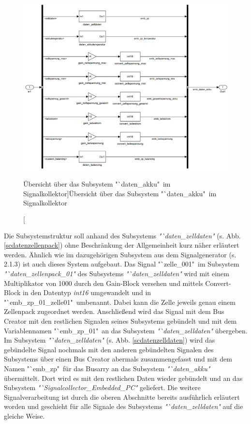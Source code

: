 \documentclass[fontsize = 12pt, paper = a4]{scrreprt}
\begin{document}
\newpage

\begin{figure}[h]
\centering
\includegraphics[scale = 0.45]{sc_daten_akku}
\caption[Übersicht über das Subsystem "`daten\_akku"\ im Signalkollektor]{Übersicht über das Subsystem "`daten\_akku"\ im Signalkollektor}
\label{scdatenakku}
\end{figure}

Die Subsystemstruktur soll anhand des Subsystems \textit{"`daten\_zelldaten"} (s. Abb. \ref{scdatenzellenpack}) ohne Beschränkung der Allgemeinheit kurz näher erläutert werden. Ähnlich wie im dazugehörigen Subsystem aus dem Signalgenerator (s. 2.1.3) ist auch dieses System aufgebaut. Das Signal "`zelle\_001"\ im Subsystem \textit{"`daten\_zellenpack\_01"} des Subsystems \textit{"`daten\_zelldaten"} wird mit einem Multiplikator von 1000 durch den Gain-Block versehen und mittels Convert-Block in den Datentyp \textit{int16} umgewandelt und in "`emb\_zp\_01\_zelle01"\ umbenannt. Dabei kann die Zelle jeweils genau einem Zellenpack zugeordnet werden. Anschließend wird das Signal mit dem Bus Creator mit den restlichen Signalen seines Subsystems gebündelt und mit dem Variablennamen "`emb\_zp\_01"\ an das Subsystem \textit{"`daten\_zelldaten"} übergeben. Im Subsystem \textit{"`daten\_zelldaten"} (s. Abb. \ref{scdatenzelldaten}) wird das gebündelte Signal nochmals mit den anderen gebündelten Signalen des Subsystems über einen Bus Creator abermals zusammengefasst und mit dem Namen "`emb\_zp"\ für das Busarry an das Subsystem \textit{"`daten\_akku"} übermittelt. Dort wird es mit den restlichen Daten wieder gebündelt und an das Subsystem \textit{"`Signalcollector\_Embedded\_PC"} geliefert. Die weitere Signalverarbeitung ist durch die oberen Abschnitte bereits ausführlich erläutert worden und geschieht für alle Signale des Subsystems \textit{"`daten\_zelldaten"} auf die gleiche Weise.
\end{document}
